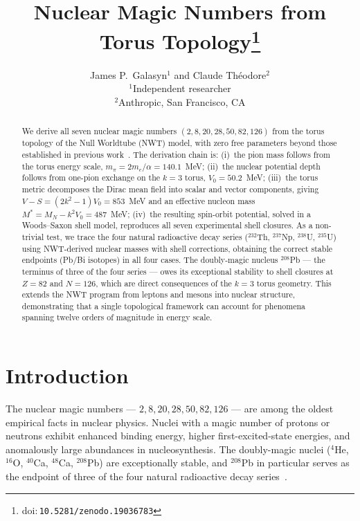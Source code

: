 \documentclass[11pt,a4paper]{article}
\title{\textbf{Nuclear Magic Numbers from Torus Topology}\footnote{doi:\,\texttt{10.5281/zenodo.19036783}}}
\author{
  James P.\ Galasyn$^{1}$ and Claude Th\'eodore$^{2}$ \\[6pt]
  \small $^{1}$Independent researcher \\
  \small $^{2}$Anthropic, San Francisco, CA
}
\date{}
\begin{document}
\maketitle

\begin{abstract}
We derive all seven nuclear magic numbers $(2, 8, 20, 28, 50, 82, 126)$
from the torus topology of the Null Worldtube (NWT) model, with zero free
parameters beyond those established in previous work~\cite{paper1,paper2}.
The derivation chain is:
(i)~the pion mass follows from the torus energy scale,
$m_\pi = 2m_e/\alpha = 140.1$~MeV;
(ii)~the nuclear potential depth follows from one-pion exchange on the $k=3$
torus, $V_0 = 50.2$~MeV;
(iii)~the torus metric decomposes the Dirac mean field into scalar and vector
components, giving $V - S = (2k^2-1)V_0 = 853$~MeV and an effective nucleon
mass $M^* = M_N - k^2 V_0 = 487$~MeV;
(iv)~the resulting spin-orbit potential, solved in a Woods--Saxon shell model,
reproduces all seven experimental shell closures.
As a non-trivial test, we trace the four natural radioactive decay series
(${}^{232}$Th, ${}^{237}$Np, ${}^{238}$U, ${}^{235}$U) using NWT-derived
nuclear masses with shell corrections, obtaining the correct stable endpoints
(Pb/Bi isotopes) in all four cases.
The doubly-magic nucleus ${}^{208}$Pb --- the terminus of three of the four
series --- owes its exceptional stability to shell closures at $Z=82$ and
$N=126$, which are direct consequences of the $k=3$ torus geometry.
This extends the NWT program from leptons and mesons into nuclear structure,
demonstrating that a single topological framework can account for phenomena
spanning twelve orders of magnitude in energy scale.
\end{abstract}


\section{Introduction}
\label{sec:intro}

The nuclear magic numbers --- $2, 8, 20, 28, 50, 82, 126$ --- are among the
oldest empirical facts in nuclear physics.  Nuclei with a magic number of
protons or neutrons exhibit enhanced binding energy, higher first-excited-state
energies, and anomalously large abundances in nucleosynthesis.  The
doubly-magic nuclei (${}^4$He, ${}^{16}$O, ${}^{40}$Ca, ${}^{48}$Ca,
${}^{208}$Pb) are exceptionally stable, and ${}^{208}$Pb in particular serves
as the endpoint of three of the four natural radioactive decay
series~\cite{mayer1949,haxel1949}.
\end{document}
